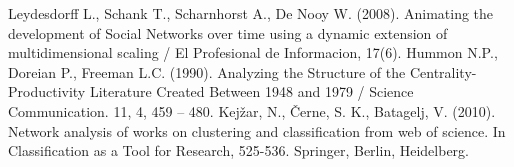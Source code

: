 \documentclass[11pt]{article} %
\begin{document}
\begin{thebibliography}{99}
   Leydesdorff L., Schank T., Scharnhorst A., De Nooy W. (2008). Animating the development of Social Networks over time using a dynamic extension of multidimensional scaling / El Profesional de Informacion, 17(6).
   Hummon N.P., Doreian P., Freeman L.C. (1990). Analyzing the Structure of the Centrality-Productivity Literature Created Between 1948 and 1979 / Science Communication. 11, 4, 459 – 480. 
Kejžar, N., Černe, S. K., Batagelj, V. (2010). Network analysis of works on clustering and classification from web of science. In Classification as a Tool for Research, 525-536. Springer, Berlin, Heidelberg.
\end{thebibliography}   

\appendix
\end{document}
